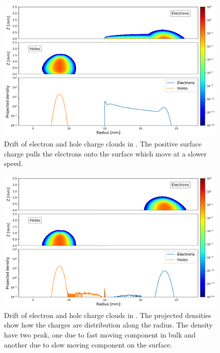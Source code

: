 \begin{figure}[!htb]
    \includegraphics[trim={0cm 0 0cm 0},clip,width=0.99\linewidth]{ch3/figs/drift_path_sc=0.3.png}
    \caption{Drift of electron and hole charge clouds in {\tdsim}. The positive surface charge pulls the electrons onto the surface which move at a slower speed.}
    \label{ch3:fig:ehd_path_pd_sc0.3}
\end{figure}


\begin{figure}[!htb]
    \includegraphics[trim={0cm 0 0cm 0},clip,width=0.99\linewidth]{ch3/figs/drift_path_sc=0.0.png}
    \caption{Drift of electron and hole charge clouds in {\tdsim}. The projected densities show how the charges are distribution along the radius. The density have two peak, one due to fast moving component in bulk and another due to slow moving component on the surface.}
    \label{ch3:fig:ehd_path_pd_sc0}
\end{figure}



